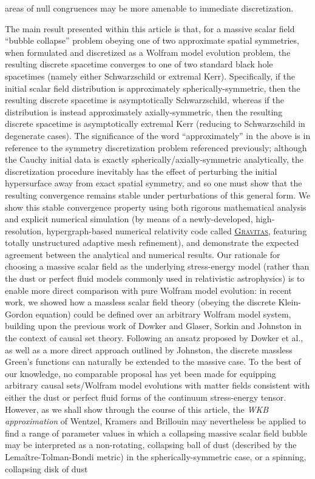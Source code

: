 \documentclass{article}
\begin{document}
areas of null congruences may be more amenable to immediate discretization.

The main result presented within this article is that, for a massive scalar field ``bubble collapse'' problem obeying one of two approximate spatial symmetries, when formulated and discretized as a Wolfram model evolution problem, the resulting discrete spacetime converges to one of two standard black hole spacetimes (namely either Schwarzschild or extremal Kerr). Specifically, if the initial scalar field distribution is approximately spherically-symmetric, then the resulting discrete spacetime is asymptotically Schwarzschild, whereas if the distribution is instead approximately axially-symmetric, then the resulting discrete spacetime is asymptotically extremal Kerr (reducing to Schwarzschild in degenerate cases). The significance of the word ``approximately'' in the above is in reference to the symmetry discretization problem referenced previously; although the Cauchy initial data is exactly spherically/axially-symmetric analytically, the discretization procedure inevitably has the effect of perturbing the initial hypersurface away from exact spatial symmetry, and so one must show that the resulting convergence remains stable under perturbations of this general form. We show this stable convergence property using both rigorous mathematical analysis and explicit numerical simulation (by means of a newly-developed, high-resolution, hypergraph-based numerical relativity code called \href{https://github.com/JonathanGorard/Gravitas}{\textsc{Gravitas}}, featuring totally unstructured adaptive mesh refinement), and demonstrate the expected agreement between the analytical and numerical results. Our rationale for choosing a massive scalar field as the underlying stress-energy model (rather than the dust or perfect fluid models commonly used in relativistic astrophysics) is to enable more direct comparison with pure Wolfram model evolution: in recent work\cite{gorard5}, we showed how a massless scalar field theory (obeying the discrete Klein-Gordon equation) could be defined over an arbitrary Wolfram model system, building upon the previous work of Dowker and Glaser\cite{dowker}, Sorkin\cite{sorkin3} and Johnston\cite{johnston} in the context of causal set theory. Following an ansatz proposed by Dowker et al.\cite{dowker2}, as well as a more direct approach outlined by Johnston\cite{johnston2}\cite{johnston3}, the discrete massless Green's functions can naturally be extended to the massive case. To the best of our knowledge, no comparable proposal has yet been made for equipping arbitrary causal sets/Wolfram model evolutions with matter fields consistent with either the dust or perfect fluid forms of the continuum stress-energy tensor. However, as we shall show through the course of this article, the \textit{WKB approximation} of Wentzel\cite{wentzel}, Kramers\cite{kramers} and Brillouin\cite{brillouin} may nevertheless be applied to find a range of parameter values in which a collapsing massive scalar field bubble may be interpreted as a non-rotating, collapsing ball of dust (described by the Lema\^itre-Tolman-Bondi metric\cite{lemaitre}\cite{tolman}\cite{bondi}) in the spherically-symmetric case, or a spinning, collapsing disk of dust 
\end{document}
